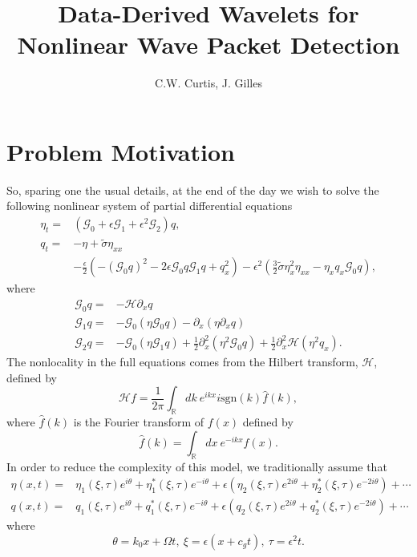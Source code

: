 \documentclass[a4paper,11pt]{article}
\title{Data-Derived Wavelets for Nonlinear Wave Packet Detection}
\author{C.W. Curtis, J. Gilles}
\date{}
\newcommand{\p}{\partial}
\begin{document}
\maketitle
\section*{Problem Motivation}
So, sparing one the usual details, at the end of the day we wish to solve the following nonlinear system of partial differential equations
\begin{align}
\eta_{t} = & \left(\mathcal{G}_{0} + \epsilon \mathcal{G}_{1} + \epsilon^{2}\mathcal{G}_{2}\right)q, \label{knmct}\\
q_{t} = & -\eta + \tilde{\sigma}\eta_{xx} \nonumber \\
& - \frac{\epsilon}{2} \left(-\left(\mathcal{G}_{0}q\right)^{2} - 2\epsilon\mathcal{G}_{0}q\mathcal{G}_{1}q + q_{x}^{2} \right)
- \epsilon^{2} \left( \frac{3}{2}\tilde{\sigma}\eta_{x}^{2}\eta_{xx} - \eta_{x} q_{x}\mathcal{G}_{0}q  \right) \label{bernou},
\end{align}
where
\begin{align*}
\mathcal{G}_{0}q = & -\mathcal{H}\p_{x}q\\
\mathcal{G}_{1}q = & -\mathcal{G}_{0}\left(\eta \mathcal{G}_{0}q\right) - \p_{x}\left(\eta \p_{x}q\right)\\
\mathcal{G}_{2}q = & -\mathcal{G}_{0}\left(\eta \mathcal{G}_{1}q\right)  + \frac{1}{2}\p_{x}^{2}\left(\eta^{2}\mathcal{G}_{0}q\right) + \frac{1}{2}\p_{x}^{2}\mathcal{H}\left(\eta^{2}q_{x}\right).
\end{align*}
The nonlocality in the full equations comes from the Hilbert transform, $\mathcal{H}$, defined by 
\[
\mathcal{H}f = \frac{1}{2\pi}\int_{\mathbb{R}}dk~ e^{ikx}  i\mbox{sgn}(k) \hat{f}(k),
\]
where $\hat{f}(k)$ is the Fourier transform of $f(x)$ defined by
\[
\hat{f}(k) = \int_{\mathbb{R}}dx~ e^{-ikx}f(x).
\]
In order to reduce the complexity of this model, we traditionally assume that 
\begin{align*}
\eta(x,t) = & \eta_{1}(\xi,\tau)e^{i\theta} +  \eta_{1}^{\ast}(\xi,\tau)e^{-i\theta} + \epsilon\left(\eta_{2}(\xi,\tau)e^{2i\theta} +  \eta_{2}^{\ast}(\xi,\tau)e^{-2i\theta}\right)+\cdots\\
q(x,t) = & q_{1}(\xi,\tau)e^{i\theta} +  q_{1}^{\ast}(\xi,\tau)e^{-i\theta} + \epsilon\left(q_{2}(\xi,\tau)e^{2i\theta} +  q_{2}^{\ast}(\xi,\tau)e^{-2i\theta}\right)+\cdots
\end{align*}
where
\begin{equation*}
\theta = k_{0}x + \Omega t, ~ \xi = \epsilon(x + c_{g}t), ~ \tau = \epsilon^{2}t.
\end{equation*}
\end{document}
